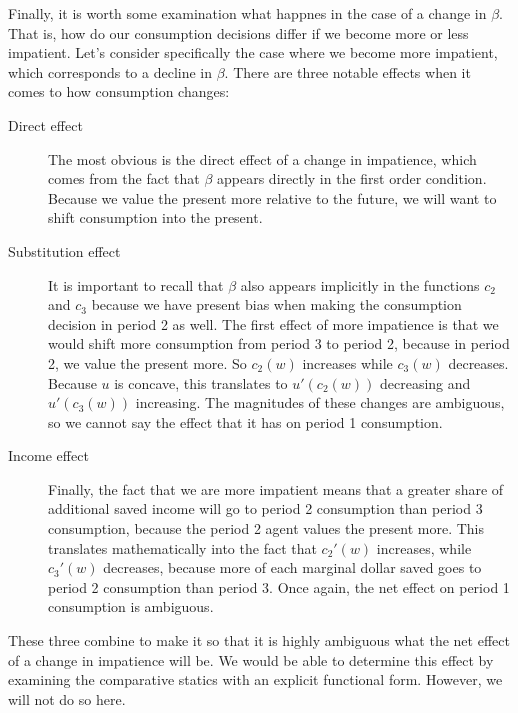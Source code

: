 Finally, it is worth some examination what happnes in the case of a change in $\beta$. That is, how do our consumption decisions differ if we become more or less impatient. Let's consider specifically the case where we become more impatient, which corresponds to a decline in $\beta$. There are three notable effects when it comes to how consumption changes:
\begin{description}
    \item[Direct effect] The most obvious is the direct effect of a change in impatience, which comes from the fact that $\beta$ appears directly in the first order condition. Because we value the present more relative to the future, we will want to shift consumption into the present. 
    \item[Substitution effect] It is important to recall that $\beta$ also appears implicitly in the functions $c_2$ and $c_3$ because we have present bias when making the consumption decision in period 2 as well. The first effect of more impatience is that we would shift more consumption from period 3 to period 2, because in period 2, we value the present more. So $c_2(w)$ increases while $c_3(w)$ decreases. Because $u$ is concave, this translates to $u'(c_2(w))$ decreasing and $u'(c_3(w))$ increasing. The magnitudes of these changes are ambiguous, so we cannot say the effect that it has on period 1 consumption.
    \item[Income effect] Finally, the fact that we are more impatient means that a greater share of additional saved income will go to period 2 consumption than period 3 consumption, because the period 2 agent values the present more. This translates mathematically into the fact that $c_2'(w)$ increases, while $c_3'(w)$ decreases, because more of each marginal dollar saved goes to period 2 consumption than period 3. Once again, the net effect on period 1 consumption is ambiguous. 
\end{description}
These three combine to make it so that it is highly ambiguous what the net effect of a change in impatience will be. We would be able to determine this effect by examining the comparative statics with an explicit functional form. However, we will not do so here.